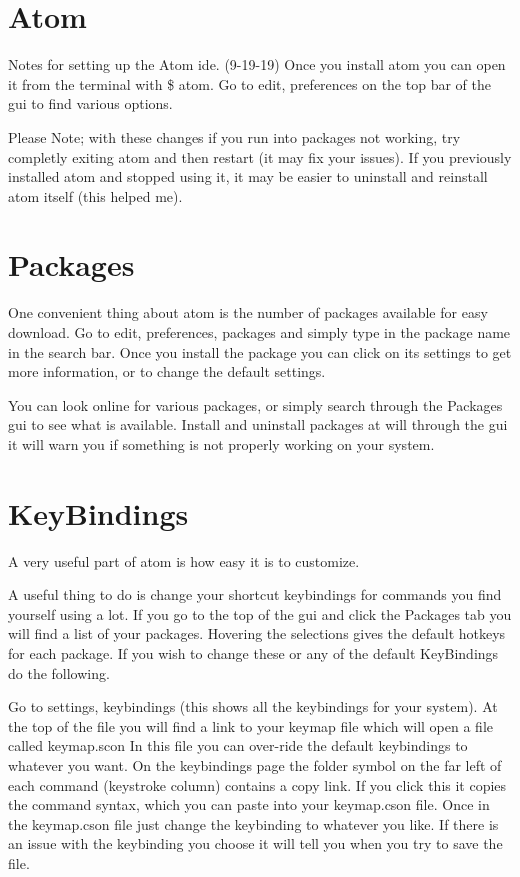 \documentclass[preprint,showpacs,preprintnumbers,amsmath,amssymb]{revtex4}
\begin{document}
\section*{Atom}
Notes for setting up the Atom ide. (9-19-19)
Once you install atom you can open it from the terminal with \$ atom.
Go to edit, preferences on the top bar of the gui to find various options.

Please Note; with these changes if you run into packages not working, try
completly exiting atom and then restart (it may fix your issues).
If you previously installed atom and stopped using it, it may be easier to
uninstall and reinstall atom itself (this helped me).

\section{Packages}
One convenient thing about atom is the number of packages available for easy
download.
Go to edit, preferences, packages and simply type in the package name in the
search bar.
Once you install the package you can click on its settings to get more
information, or to change the default settings.

You can look online for various packages, or simply search through the Packages
gui to see what is available.
Install and uninstall packages at will through the gui it will warn you if
something is not properly working on your system.

\section{KeyBindings}
A very useful part of atom is how easy it is to customize.

A useful thing to do is change your shortcut keybindings for commands you find
yourself using a lot.
If you go to the top of the gui and click the Packages tab you will find a list
of your packages.
Hovering the selections gives the default hotkeys for each package.
If you wish to change these or any of the default KeyBindings do the following.

Go to settings, keybindings (this shows all the keybindings for your system).
At the top of the file you will find a link to your keymap file which will open
a file called keymap.scon
In this file you can over-ride the default keybindings to whatever you want.
On the keybindings page the folder symbol on the far left of each command
(keystroke column) contains a copy link.
If you click this it copies the command syntax, which you can paste into your
keymap.cson file.
Once in the keymap.cson file just change the keybinding to whatever you like.
If there is an issue with the keybinding you choose it will tell you when you
try to save the file.
\end{document}
